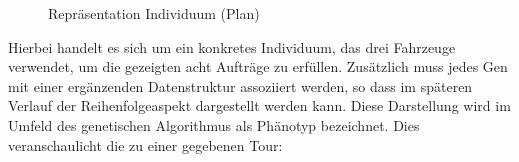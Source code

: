 \begin{figure}[ht!]
	\centering
      \hspace{0.5cm}
      \hspace{0.5cm}
      \caption{Repräsentation Individuum (Plan)}
      \label{fig:Repraesentation234}
\end{figure}

Hierbei handelt es sich um ein konkretes Individuum, das drei Fahrzeuge verwendet, um die gezeigten acht Aufträge zu erfüllen. Zusätzlich muss jedes Gen mit einer ergänzenden Datenstruktur assoziiert werden, so dass im späteren Verlauf der Reihenfolgeaspekt dargestellt werden kann. Diese Darstellung wird im Umfeld des genetischen Algorithmus als Phänotyp bezeichnet. Dies veranschaulicht die  zu einer gegebenen Tour:

